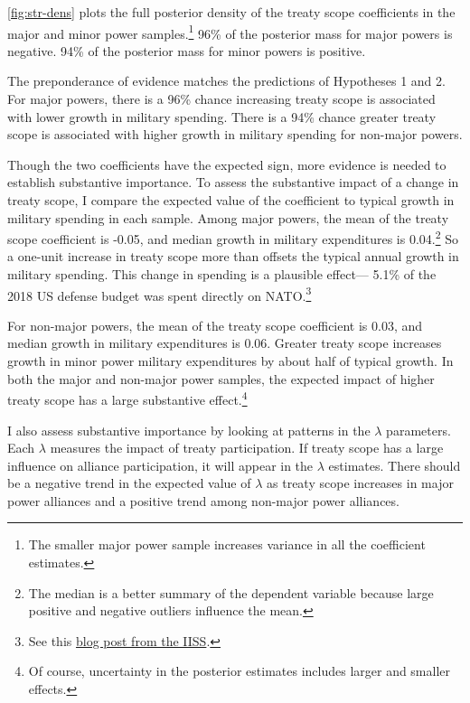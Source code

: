 \documentclass[12pt]{article}
\begin{document}
\autoref{fig:str-dens} plots the full posterior density of the treaty scope coefficients in the major and minor power samples.\footnote{The smaller major power sample increases variance in all the coefficient estimates.} 
96\% of the posterior mass for major powers is negative. 
94\% of the posterior mass for minor powers is positive. 


The preponderance of evidence matches the predictions of Hypotheses 1 and 2. 
For major powers, there is a 96\% chance increasing treaty scope is associated with lower growth in military spending. 
There is a 94\% chance greater treaty scope is associated with higher growth in military spending for non-major powers.


Though the two coefficients have the expected sign, more evidence is needed to establish substantive importance. 
To assess the substantive impact of a change in treaty scope, I compare the expected value of the coefficient to typical growth in military spending in each sample. 
Among major powers, the mean of the treaty scope coefficient is -0.05, and median growth in military expenditures is 0.04.\footnote{The median is a better summary of the dependent variable because large positive and negative outliers influence the mean.} 
So a one-unit increase in treaty scope more than offsets the typical annual growth in military spending. 
This change in spending is a plausible effect--- 5.1\% of the 2018 US defense budget was spent directly on NATO.\footnote{See this \href{https://www.iiss.org/blogs/military-balance/2018/07/us-and-nato-allies-costs-and-value}{blog post from the IISS}.} 


For non-major powers, the mean of the treaty scope coefficient is 0.03, and median growth in military expenditures is 0.06. 
Greater treaty scope increases growth in minor power military expenditures by about half of typical growth. 
In both the major and non-major power samples, the expected impact of higher treaty scope has a large substantive effect.\footnote{Of course, uncertainty in the posterior estimates includes larger and smaller effects.}


I also assess substantive importance by looking at patterns in the $\lambda$ parameters. 
Each $\lambda$ measures the impact of treaty participation. 
If treaty scope has a large influence on alliance participation, it will appear in the $\lambda$ estimates. 
There should be a negative trend in the expected value of $\lambda$ as treaty scope increases in major power alliances and a positive trend among non-major power alliances. 
\end{document}
